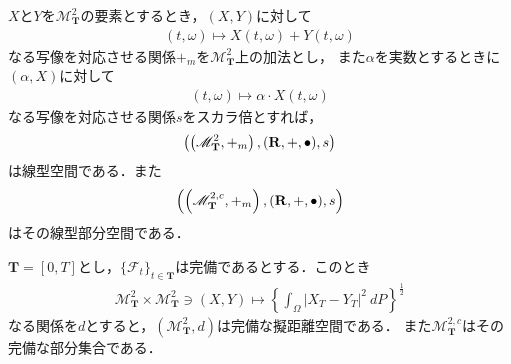 	\begin{screen}
		\begin{thm}
			$X$と$Y$を$\mathscr{M}^2_{\mathbf{T}}$の要素とするとき，$(X,Y)$に対して
			\begin{align}
				(t,\omega) \longmapsto X(t,\omega) + Y(t,\omega)
			\end{align}
			なる写像を対応させる関係$+_m$を$\mathscr{M}^2_{\mathbf{T}}$上の加法とし，
			また$\alpha$を実数とするときに$(\alpha,X)$に対して
			\begin{align}
				(t,\omega) \longmapsto \alpha \cdot X(t,\omega)
			\end{align}
			なる写像を対応させる関係$s$をスカラ倍とすれば，
			\begin{align}
				\left(\left(\mathscr{M}^2_{\mathbf{T}},+_m \right),(\mathbf{R},+,\bullet),s\right)
			\end{align}
			は線型空間である．また
			\begin{align}
				\left(\left(\mathscr{M}^{2,c}_{\mathbf{T}},+_m \right),(\mathbf{R},+,\bullet),s\right)
			\end{align}
			はその線型部分空間である．
		\end{thm}
	\end{screen}
	
	\begin{screen}
		\begin{thm}
		\label{thm:pseudo_metric_on_square_integrable_martingales}
			$\mathbf{T} = [0,T]$とし，$\{\mathscr{F}_t\}_{t \in \mathbf{T}}$は完備であるとする．このとき
			\begin{align}
				\mathscr{M}^2_{\mathbf{T}} \times \mathscr{M}^2_{\mathbf{T}} \ni (X,Y) \longmapsto
				\left\{\int_\Omega |X_T-Y_T|^2\ dP\right\}^{\frac{1}{2}}
			\end{align}
			なる関係を$d$とすると，$\left(\mathscr{M}^2_{\mathbf{T}},d\right)$は完備な擬距離空間である．
			また$\mathscr{M}^{2,c}_{\mathbf{T}}$はその完備な部分集合である．
		\end{thm}
	\end{screen}
	
